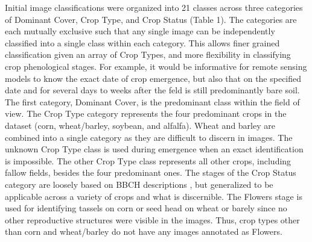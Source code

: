 \documentclass[remotesensing,article,submit,moreauthors,pdftex]{Definitions/mdpi}
\begin{document}
Initial image classifications were organized into 21 classes across three categories of Dominant Cover, Crop Type, and Crop Status (Table 1). The categories are each mutually exclusive such that any single image can be independently classified into a single class within each category. This allows finer grained classification given an array of Crop Types, and more flexibility in classifying crop phenological stages. For example, it would be informative for remote sensing models to know the exact date of crop emergence, but also that on the specified date and for several days to weeks after the feld is still predominantly bare soil. The first category, Dominant Cover, is the predominant class within the field of view. The Crop Type category represents the four predominant crops in the dataset (corn, wheat/barley, soybean, and alfalfa). Wheat and barley are combined into a single category as they are difficult to discern in images. The unknown Crop Type class is used during emergence when an exact identification is impossible. The other Crop Type class represents all other crops, including fallow fields, besides the four predominant ones. The stages of the Crop Status category are loosely based on BBCH descriptions \citep{meier1997}, but generalized to be applicable across a variety of crops and what is discernible. The Flowers stage is used for identifying tassels on corn or seed head on wheat or barely since no other reproductive structures were visible in the images. Thus, crop types other than corn and wheat/barley do not have any images annotated as Flowers.
\end{document}
